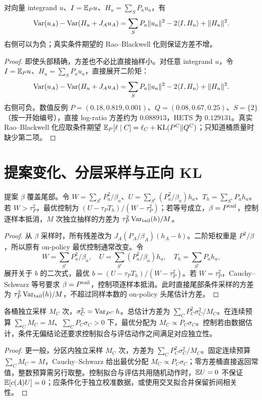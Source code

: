 \begin{proposition}[精确头部不保证逐输入降方差]
对向量 integrand $u$、$I=\mathbb E_Pu$、$H_u=\sum_SP_au_a$，有
\begin{equation}
\operatorname{Var}(u_A)-\operatorname{Var}(H_u+J_Au_A)
=\sum_SP_a\|u_a\|^2-2\langle I,H_u\rangle+\|H_u\|^2.
\end{equation}
右侧可以为负；真实条件期望的 Rao--Blackwell 化则保证方差不增。
\end{proposition}
\begin{proof}
即使头部精确，方差也不必比直接抽样小。对任意 integrand $u$，令 $I=\mathbb E_Pu$、$H_u=\sum_SP_au_a$，直接展开二阶矩：
\begin{equation}
\operatorname{Var}(u_A)-\operatorname{Var}(H_u+J_Au_A)
=\sum_SP_a\|u_a\|^2-2\langle I,H_u\rangle+\|H_u\|^2.
\end{equation}
右侧可负。数值反例 $P=(0.18,0.819,0.001)$、$Q=(0.08,0.67,0.25)$、$S=\{2\}$（按一开始编号），直接 log-ratio 方差约为 $0.088913$，HETS 为 $0.129131$。真实 Rao--Blackwell 化应取条件期望 $\mathbb E_P[\ell\mid C]=\ell_C+\operatorname{KL}(P^C\Vert Q^C)$；只知道桶质量时缺少第二项。
\end{proof}

\section{提案变化、分层采样与正向 KL}
\begin{proposition}[一般提案下的最优尾部常控制]
提案 $\beta$ 覆盖尾部。令 $W=\sum_{S^c}P_a^2/\beta_a$、$U=\sum_{S^c}(P_a^2/\beta_a)h_a$、$T_h=\sum_{S^c}P_ah_a$。若 $W>\tau_P^2$，最优控制为 $(U-\tau_PT_h)/(W-\tau_P^2)$；若等号成立，$\beta=P^{\rm tail}$，控制逐样本抵消，$M$ 次独立抽样的方差为 $\tau_P^2\operatorname{Var}_{\rm tail}(h)/M$。
\end{proposition}
\begin{proof}
从 $\beta$ 采样时，所有残差改为 $J_A(P_A/\beta_A)(h_A-b)$。二阶矩权重是 $P^2/\beta$，所以原有 on-policy 最优控制通常改变。令
\begin{equation}
W=\sum_{S^c}P_a^2/\beta_a,\quad U=\sum_{S^c}(P_a^2/\beta_a)h_a,\quad
T_h=\sum_{S^c}P_ah_a,
\end{equation}
展开关于 $b$ 的二次式，最优 $b=(U-\tau_PT_h)/(W-\tau_P^2)$。若 $W=\tau_P^2$，Cauchy--Schwarz 等号要求 $\beta=P^{\rm tail}$，控制项逐样本抵消。此时直接尾部条件采样的方差为 $\tau_P^2\operatorname{Var}_{\rm tail}(h)/M$，不超过同样本数的 on-policy 头尾估计方差。
\end{proof}

\begin{proposition}[分层预算的最优分配]
各桶独立采样 $M_C$ 次，$\sigma_C^2=\operatorname{Var}_{P^C}h$。总估计方差为 $\sum_CP_C^2\sigma_C^2/M_C$。在连续预算 $\sum_CM_C=M$、$\sum_CP_C\sigma_C>0$ 下，最优分配为 $M_C\propto P_C\sigma_C$。控制若由数据估计，条件无偏结论还要求控制拟合与评估动作之间满足对应独立性。
\end{proposition}
\begin{proof}
更一般，分区内独立采样 $M_C$ 次，方差为 $\sum_CP_C^2\sigma_C^2/M_C$。固定连续预算 $\sum_CM_C=M$，Cauchy--Schwarz 给出最优分配 $M_C\propto P_C\sigma_C$；零方差桶直接返回常值，整数预算需另行取整。控制拟合与评估共用随机动作时，$\mathbb E U=0$ 不保证 $\mathbb E[c(A)U]=0$；应条件化于独立校准数据，或使用交叉拟合并保留折间相关性。
\end{proof}

